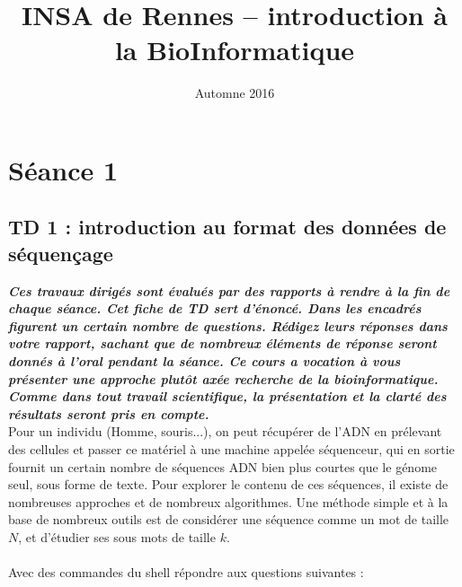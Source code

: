\documentclass{article}
\title{INSA de Rennes -- introduction à la BioInformatique}
\author{ }
\date{Automne 2016}
\begin{document}
\maketitle

\section*{Séance 1}
\subsection*{TD 1 : introduction au format des données de séquençage}

\textit{\textbf{Ces travaux dirigés sont évalués par des rapports à rendre à la fin de chaque séance. Cet fiche de TD sert d'énoncé. Dans les encadrés figurent un certain nombre de questions. Rédigez leurs réponses dans votre rapport, sachant que de nombreux éléments de réponse seront donnés à l'oral pendant la séance. Ce cours a vocation à vous présenter une approche plutôt axée recherche de la bioinformatique.
Comme dans tout travail scientifique, la présentation et la clarté des résultats seront pris en compte.}}\\

Pour un individu (Homme, souris...), on peut récupérer de l'ADN en prélevant des cellules et passer ce matériel à une machine appelée séquenceur, qui en sortie fournit un certain nombre de séquences ADN bien plus courtes que le génome seul, sous forme de texte. Pour explorer le contenu de ces séquences, il existe de nombreuses approches et de nombreux algorithmes. Une méthode simple et à la base de nombreux outils est de considérer une séquence comme un mot de taille $N$, et d'étudier ses sous mots de taille $k$.\\

\noindent{}\\


Avec des commandes du shell répondre aux questions suivantes :\\
\noindent{}\\
\end{document}
